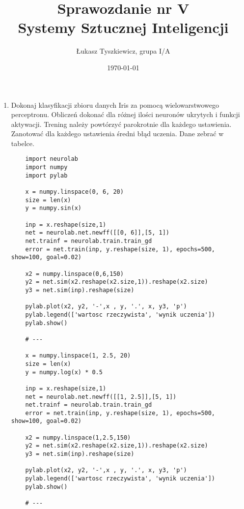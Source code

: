 \documentclass[12pt,a4paper]{article}
\begin{document}
       
        \title{Sprawozdanie nr V\\ Systemy Sztucznej Inteligencji}
        \author{Łukasz Tyszkiewicz, grupa I/A}
        \date{\today}
       
        \maketitle
        \newpage
        \begin{enumerate}
            \item Dokonaj klasyfikacji zbioru danych Iris za pomocą wielowarstwowego perceptronu. Obliczeń dokonać dla różnej ilości neuronów ukrytych i funkcji aktywacji. Trening należy powtórzyć parokrotnie dla każdego ustawienia. Zanotować dla każdego ustawienia średni błąd uczenia. Dane zebrać w tabelce.
           
                    \begin{verbatim}
    import neurolab
    import numpy
    import pylab
     
    x = numpy.linspace(0, 6, 20)
    size = len(x)
    y = numpy.sin(x)
     
    inp = x.reshape(size,1)
    net = neurolab.net.newff([[0, 6]],[5, 1])
    net.trainf = neurolab.train.train_gd
    error = net.train(inp, y.reshape(size, 1), epochs=500, show=100, goal=0.02)
     
    x2 = numpy.linspace(0,6,150)
    y2 = net.sim(x2.reshape(x2.size,1)).reshape(x2.size)
    y3 = net.sim(inp).reshape(size)
     
    pylab.plot(x2, y2, '-',x , y, '.', x, y3, 'p')
    pylab.legend(['wartosc rzeczywista', 'wynik uczenia'])
    pylab.show()
     
    # ---
     
    x = numpy.linspace(1, 2.5, 20)
    size = len(x)
    y = numpy.log(x) * 0.5
     
    inp = x.reshape(size,1)
    net = neurolab.net.newff([[1, 2.5]],[5, 1])
    net.trainf = neurolab.train.train_gd
    error = net.train(inp, y.reshape(size, 1), epochs=500, show=100, goal=0.02)
     
    x2 = numpy.linspace(1,2.5,150)
    y2 = net.sim(x2.reshape(x2.size,1)).reshape(x2.size)
    y3 = net.sim(inp).reshape(size)
     
    pylab.plot(x2, y2, '-',x , y, '.', x, y3, 'p')
    pylab.legend(['wartosc rzeczywista', 'wynik uczenia'])
    pylab.show()
     
    # ---
     

\end{verbatim}
\end{enumerate}
\end{document}

